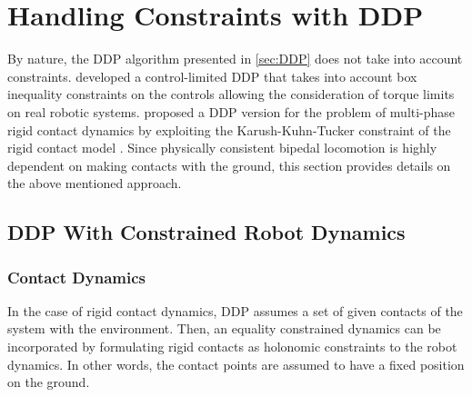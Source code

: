 %
%
%


\section{Handling Constraints with DDP}\label{sec:ConstrainedDDP}
By nature, the \gls{DDP} algorithm presented in \cref{sec:DDP} does not take into account constraints. \citeauthor{tassa2014control} developed a control-limited \gls{DDP} \cite{tassa2014control} that takes into account box inequality constraints on the controls allowing the consideration of torque limits on real robotic systems. \citeauthor{budhiraja2018differential} proposed a \gls{DDP} version for the problem of multi-phase rigid contact dynamics by exploiting the Karush-Kuhn-Tucker constraint of the rigid contact model \cite{budhiraja2018differential}. Since physically consistent bipedal locomotion is highly dependent on making contacts with the ground, this section provides details on the above mentioned approach.  

\subsection{DDP With Constrained Robot Dynamics}
\subsubsection{Contact Dynamics}
In the case of rigid contact dynamics, \gls{DDP} assumes a set of given contacts of the system with the environment. Then, an equality constrained dynamics can be incorporated by formulating rigid contacts as holonomic constraints to the robot dynamics. In other words, the contact points are assumed to have a fixed position on the ground. 

